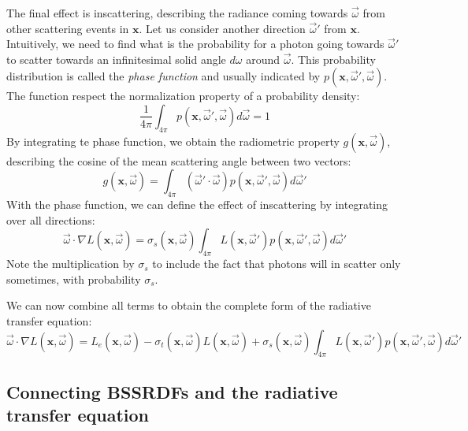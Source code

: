 The final effect is inscattering, describing the radiance coming towards $\vec{\omega}$ from other scattering events in $\mathbf{x}$. Let us consider another direction $\vec{\omega}'$ from $\mathbf{x}$. Intuitively, we need to find what is the probability for a photon going towards $\vec{\omega}'$ to scatter towards an infinitesimal solid angle $d{\omega}$ around $\vec{\omega}$. This probability distribution is called the \emph{phase function} and usually indicated by $p(\mathbf{x}, \vec{\omega}', \vec{\omega})$. The function respect the normalization property of a probability density:
$$\frac{1}{4\pi}\int_{4\pi} p(\mathbf{x}, \vec{\omega}', \vec{\omega}) d\vec{\omega} = 1$$
By integrating te phase function, we obtain the radiometric property $g(\mathbf{x}, \vec{\omega})$, describing the cosine of the mean scattering angle between two vectors:
$$g(\mathbf{x}, \vec{\omega}) = \int_{4\pi} (\vec{\omega}' \cdot \vec{\omega}) p(\mathbf{x}, \vec{\omega}', \vec{\omega}) d\vec{\omega}'$$
With the phase function, we can define the effect of inscattering by integrating over all directions:
$$\vec{\omega} \cdot \nabla L(\mathbf{x}, \vec{\omega}) = \sigma_s(\mathbf{x}, \vec{\omega}) \int_{4\pi} L(\mathbf{x}, \vec{\omega}')  p(\mathbf{x}, \vec{\omega}', \vec{\omega}) d \vec{\omega}'$$
Note the multiplication by $\sigma_s$ to include the fact that photons will in scatter only sometimes, with probability $\sigma_s$. 

We can now combine all terms to obtain the complete form of the radiative transfer equation:
$$\vec{\omega} \cdot \nabla L(\mathbf{x}, \vec{\omega}) = L_e(\mathbf{x}, \vec{\omega}) - \sigma_t(\mathbf{x}, \vec{\omega}) L(\mathbf{x}, \vec{\omega}) + \sigma_s(\mathbf{x}, \vec{\omega}) \int_{4\pi} L(\mathbf{x}, \vec{\omega}')  p(\mathbf{x}, \vec{\omega}', \vec{\omega}) d \vec{\omega}'$$

\subsection{Connecting BSSRDFs and the radiative transfer equation}


